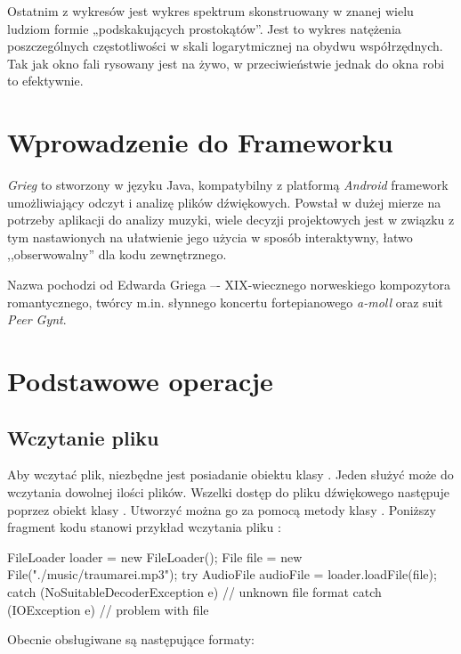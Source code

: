 Ostatnim z wykresów jest wykres spektrum skonstruowany w znanej wielu ludziom formie „podskakujących
prostokątów”. Jest to wykres natężenia poszczególnych częstotliwości w skali logarytmicznej na
obydwu współrzędnych. Tak jak okno fali rysowany jest na żywo, w przeciwieństwie jednak do okna robi
to efektywnie.

\chapter{Wprowadzenie do Frameworku}

\emph{Grieg} to stworzony w języku Java, kompatybilny z platformą \textit{Android} framework
umożliwiający odczyt i analizę plików dźwiękowych. Powstał w dużej mierze na potrzeby aplikacji do
analizy muzyki, wiele decyzji projektowych jest w związku z tym nastawionych na ułatwienie jego
użycia w sposób interaktywny, łatwo ,,obserwowalny'' dla kodu zewnętrznego.

Nazwa pochodzi od Edwarda Griega –- XIX-wiecznego norweskiego kompozytora romantycznego, twórcy
m.in.  słynnego koncertu fortepianowego \textit{a-moll} oraz suit \textit{Peer Gynt}.


\chapter{Podstawowe operacje}

\section{Wczytanie pliku}

Aby wczytać plik, niezbędne jest posiadanie obiektu klasy . Jeden 
służyć może do wczytania dowolnej ilości plików. Wszelki dostęp do pliku dźwiękowego następuje
poprzez obiekt klasy . Utworzyć można go za pomocą metody 
klasy .  Poniższy fragment kodu stanowi przykład wczytania pliku
:

\begin{java}
FileLoader loader = new FileLoader();
File file = new File("./music/traumarei.mp3");
try {
    AudioFile audioFile = loader.loadFile(file);
} catch (NoSuitableDecoderException e) {
    // unknown file format
} catch (IOException e) {
    // problem with file
}
\end{java}

Obecnie obsługiwane są następujące formaty:

